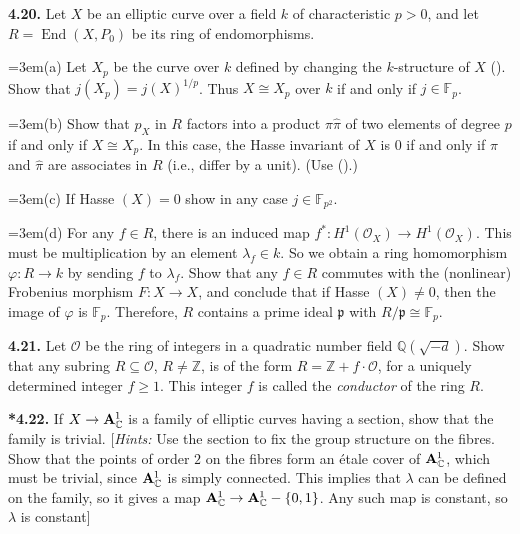 {\smallskip
\noindent\hypertarget{ex-IV-4.20}{}\textbf{4.20.} Let $X$ be an elliptic curve over a field $k$ of characteristic $p>0$, and let $R=\operatorname{End}(X,P_0)$ be its ring of endomorphisms. 

\noindent\hangindent=3em\hspace*{1.7em}(a) Let $X_p$ be the curve over $k$ defined by changing the $k$-structure of $X$ (). Show that $j(X_p)=j(X)^{1/p}$. Thus $X\cong X_p$ over $k$ if and only if $j\in\mathbb F_p$.

\noindent\hangindent=3em\hspace*{1.7em}(b) Show that $p_X$ in $R$ factors into a product $\pi\widehat\pi$ of two elements of degree $p$ if and only if $X\cong X_p$. In this case, the Hasse invariant of $X$ is $0$ if and only if $\pi$ and $\widehat\pi$ are associates in $R$ (i.e., differ by a unit). (Use ().)

\noindent\hangindent=3em\hspace*{1.7em}(c) If Hasse $(X)=0$ show in any case $j\in\mathbb F_{p^2}$.

\noindent\hangindent=3em\hspace*{1.7em}(d) For any $f\in R$, there is an induced map $f^*\colon H^1(\mathcal O_X)\to H^1(\mathcal O_X)$. This must be multiplication by an element $\lambda_f\in k$. So we obtain a ring homomorphism $\varphi\colon R\to k$ by sending $f$ to $\lambda_f$. Show that any $f\in R$ commutes with the (nonlinear) Frobenius morphism $F\colon X\to X$, and conclude that if Hasse $(X)\ne0$, then the image of $\varphi$ is $\mathbb F_p$. Therefore, $R$ contains a prime ideal $\mathfrak p$ with $R/\mathfrak p\cong\mathbb F_p$.

\smallskip
\noindent\hypertarget{ex-IV-4.21}{}\textbf{4.21.} Let $\mathcal O$ be the ring of integers in a quadratic number field $\mathbb Q(\sqrt{-d})$. Show that any subring $R\subseteq\mathcal O$, $R\ne\mathbb Z$, is of the form $R=\mathbb Z+f\cdot\mathcal O$, for a uniquely determined integer $f\ge1$. This integer $f$ is called the \emph{conductor} of the ring $R$.

\smallskip
\noindent\hypertarget{ex-IV-4.22}{}\textbf{*4.22.} If $X\to\AffSpace[\mathbb C]{1}$ is a family of elliptic curves having a section, show that the family is trivial. [\emph{Hints:} Use the section to fix the group structure on the fibres. Show that the points of order $2$ on the fibres form an \'etale cover of $\AffSpace[\mathbb C]{1}$, which must be trivial, since $\AffSpace[\mathbb C]{1}$ is simply connected. This implies that $\lambda$ can be defined on the family, so it gives a map $\AffSpace[\mathbb C]{1}\to\AffSpace[\mathbb C]{1}-\{0,1\}$. Any such map is constant, so $\lambda$ is constant]

}
